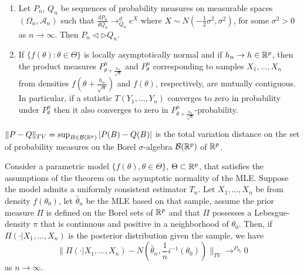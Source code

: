 \begin{thm}
  \begin{enumerate}
  \item Let $P_{n}$, $Q_{n}$ be sequences of probability measures on
    measurable spaces $(\Omega_{n}, \mathcal{A}_{n})$ such that
    $\frac{dP_{n}}{dQ_{n}} \rightarrow^{d}_{Q_{n}} e^{X}$ where $X
    \sim N(-\frac{1}{2} \sigma^{2}, \sigma^{2})$, for some $\sigma^{2}
    > 0$ as $n \rightarrow \infty$.  Then $P_{n} \triangleleft
    \triangleright Q_{n}$.
  \item If $\{ f(\theta): \theta \in \Theta \}$ is locally
    asymptotically normal and if $h_{n} \rightarrow h \in \mathbb{R}^{p}$,
    then the product measures $P^{n}_{\theta + \frac{h_{n}}{\sqrt{n}}
    }$ and $P^{n}_{\theta}$ corresponding to samples $X_{1}, \dots,
    X_{n}$ from densities $f(\theta + \frac{h_{n}}{\sqrt{n}})$ and
    $f(\theta)$, respectively, are mutually contiguous.  In
    particular, if a statistic $T(Y_{1}, \dots, Y_{n})$ converges to
    zero in probability under $P^{n}_{\theta}$ then it also converges
    to zero in $P^{n}_{\theta + \frac{h_{n}}{\sqrt{n}} }$-probability.
  \end{enumerate}
\end{thm}

\begin{defn}
  \label{sec:beginenumerate-}
  $\| P - Q \|_{TV} = \sup_{B \in \mathcal{B}(\mathbb{R}^{p})} |P(B) - Q(B)|$
  is the total variation distance on the set of probability measures
  on the Borel $\sigma$-algebra $\mathcal{B}(\mathbb{R}^{p})$ of $\mathbb{R}^{p}$.
\end{defn}

\begin{thm}
  Consider a parametric model $\{ f(\theta), \theta \in \Theta \} $,
  $\Theta \subset \mathbb{R}^{p}$, that satisfies the assumptions of the
  theorem on the asymptotic normality of the MLE.  Suppose the model
  admits a uniformly consistent estimator $T_{n}$.  Let $X_{1}, \dots,
  X_{n}$ be \iid from density $f(\theta_{0})$, let $\hat \theta_{n}$
  be the MLE based on that sample, assume the prior measure $\Pi$ is
  defined on the Borel sets of $\mathbb{R}^{p}$ and that $\Pi$ possesses a
  Lebesgue-density $\pi$ that is continuous and positive in a
  neighborhood of $\theta_{0}$. Then, if $\Pi(\cdot | X_{1}, \dots,
  X_{n})$ is the posterior distribution given the sample, we have
  \begin{equation}
    \label{eq:29}
    \| \Pi(\cdot | X_{1}, \dots, X_{n}) - N(\hat \theta_{n},
    \frac{1}{n} i^{-1}(\theta_{0})) \|_{TV}
    \rightarrow^{P_{\theta_{0}}} 0
  \end{equation} as $n \rightarrow \infty$.
\end{thm}


